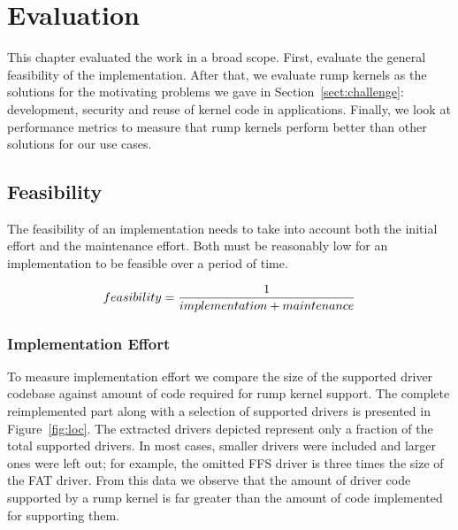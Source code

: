 
\section{Evaluation}
\label{chap:evaluation}

This chapter evaluated the work in a broad scope.  First, evaluate the general
feasibility of the implementation.  After that, we evaluate rump
kernels as the solutions for the motivating problems we gave in
Section~\ref{sect:challenge}: development, security and reuse of
kernel code in applications.  Finally, we look at performance
metrics to measure that rump kernels perform better than other
solutions for our use cases.

\subsection{Feasibility}

The feasibility of an implementation needs to take into account
both the initial effort and the maintenance effort.  Both must be
reasonably low for an implementation to be feasible over a period
of time.

\begin{equation}
feasibility = {1 \over{implementation + maintenance}}
\end{equation}

\subsubsection{Implementation Effort}

To measure implementation effort we compare the size of the supported
driver codebase against amount of code required for
rump kernel support.  The complete reimplemented part along with a
selection of supported drivers is presented in Figure~\ref{fig:loc}.
The extracted drivers depicted represent only a fraction of the
total supported drivers.  In most cases, smaller drivers were
included and larger ones were left out; for example, the omitted
FFS driver is three times the size of the FAT driver.  From this data
we observe that the amount of driver code supported by a rump kernel
is far greater than the amount of code implemented for supporting
them.

